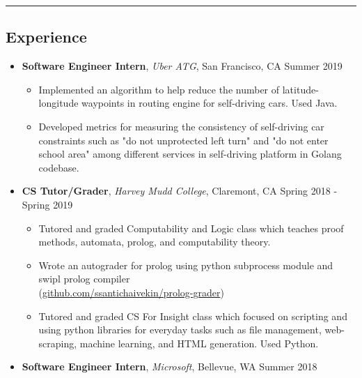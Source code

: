 \documentclass[10.5pt,letterpaper]{article}
\begin{document}
\hrule
\vspace{-0.95em}
\subsection*{Experience}
  \begin{itemize}
    \parskip=-0.45em
    \item[]
    {\textbf{Software Engineer Intern}, \textit{Uber ATG}, San Francisco, CA \hfill {Summer 2019}}
    \begin{itemize}[label=\textbullet]
      \itemsep0.1em
      \item Implemented an algorithm to help reduce the number of
      latitude-longitude waypoints in routing engine for self-driving cars. Used Java.
      \item Developed metrics for measuring the consistency of self-driving car constraints such as
      "do not unprotected left turn" and "do not enter school area" among different services in 
      self-driving platform in Golang codebase.
    \end{itemize}
    \vspace{0.1em}
    \item[]
    {\textbf{CS Tutor/Grader}, \textit{Harvey Mudd College}, Claremont, CA \hfill {Spring 2018 - Spring 2019}}
    \begin{itemize}[label=\textbullet]
      \itemsep0.1em
      \item Tutored and graded Computability and Logic class which teaches proof methods, automata, prolog,
      and computability theory. 
      \item Wrote an autograder for prolog using python subprocess module and swipl prolog compiler \\
      (\href{https://github.com/ssantichaivekin/prolog-grader}{github.com/ssantichaivekin/prolog-grader})
      \item Tutored and graded CS For Insight class which focused 
      on scripting and using python libraries for everyday tasks such as file management, web-scraping, 
      machine learning, and HTML generation. Used Python.
    \end{itemize}
    \vspace{0.1em}
    \item[]
    {\textbf{Software Engineer Intern}, \textit{Microsoft}, Bellevue, WA \hfill {Summer 2018}}

\end{itemize}
\end{document}
